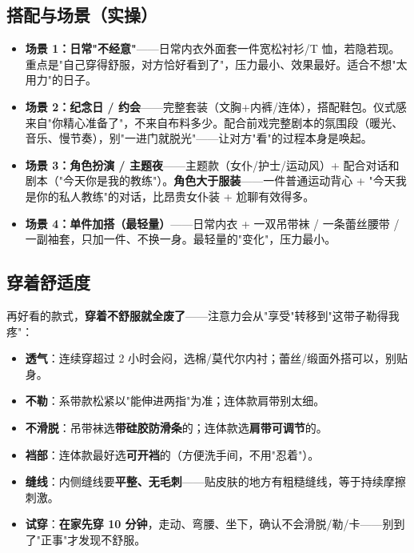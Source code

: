 \documentclass[12pt,UTF8,openany]{ctexbook}
\begin{document}
\subsection*{搭配与场景（实操）}
\begin{itemize}[leftmargin=2em,itemsep=0.4em]
  \item \textbf{场景 1：日常"不经意"}——日常内衣外面套一件宽松衬衫/T 恤，若隐若现。重点是"自己穿得舒服，对方恰好看到了"，压力最小、效果最好。适合不想"太用力"的日子。
  \item \textbf{场景 2：纪念日 / 约会}——完整套装（文胸+内裤/连体），搭配鞋包。仪式感来自"你精心准备了"，不来自布料多少。配合前戏完整剧本的氛围段（暖光、音乐、慢节奏），别"一进门就脱光"——让对方"看"的过程本身是唤起。
  \item \textbf{场景 3：角色扮演 / 主题夜}——主题款（女仆/护士/运动风）+ 配合对话和剧本（"今天你是我的教练"）。\textbf{角色大于服装}——一件普通运动背心 + "今天我是你的私人教练"的对话，比昂贵女仆装 + 尬聊有效得多。
  \item \textbf{场景 4：单件加搭（最轻量）}——日常内衣 + 一双吊带袜 / 一条蕾丝腰带 / 一副袖套，只加一件、不换一身。最轻量的"变化"，压力最小。
\end{itemize}

\subsection*{穿着舒适度}
再好看的款式，\textbf{穿着不舒服就全废了}——注意力会从"享受"转移到"这带子勒得我疼"：
\begin{itemize}[leftmargin=2em,itemsep=0.3em]
  \item \textbf{透气}：连续穿超过 2 小时会闷，选棉/莫代尔内衬；蕾丝/缎面外搭可以，别贴身。
  \item \textbf{不勒}：系带款松紧以"能伸进两指"为准；连体款肩带别太细。
  \item \textbf{不滑脱}：吊带袜选\textbf{带硅胶防滑条}的；连体款选\textbf{肩带可调节}的。
  \item \textbf{裆部}：连体款最好选\textbf{可开裆}的（方便洗手间，不用"忍着"）。
  \item \textbf{缝线}：内侧缝线要\textbf{平整、无毛刺}——贴皮肤的地方有粗糙缝线，等于持续摩擦刺激。
  \item \textbf{试穿}：\textbf{在家先穿 10 分钟}，走动、弯腰、坐下，确认不会滑脱/勒/卡——别到了"正事"才发现不舒服。
\end{itemize}
\end{document}

